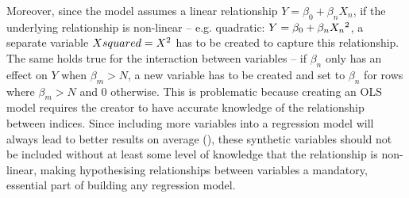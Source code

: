 \documentclass[12pt]{report}
\begin{document}
Moreover, since the model assumes a linear relationship \(Y=\beta_0+\beta_n X_n\), if the underlying relationship is non-linear -- e.g. quadratic: \(Y=\beta_0 + \beta_n X_n\textsuperscript{2}\), a separate variable \(Xsquared=X\textsuperscript{2}\) has to be created to capture this relationship. The same holds true for the interaction between variables -- if $\beta_n$ only has an effect on $Y$ when $\beta_m>N$, a new variable has to be created and set to $\beta_n$ for rows where $\beta_m>N$ and 0 otherwise. This is problematic because creating an OLS model requires the creator to have accurate knowledge of the relationship between indices. Since including more variables into a regression model will always lead to better results on average (\cite{Aoki2023}), these synthetic variables should not be included without at least some level of knowledge that the relationship is non-linear, making hypothesising relationships between variables a mandatory, essential part of building any regression model.
\end{document}
